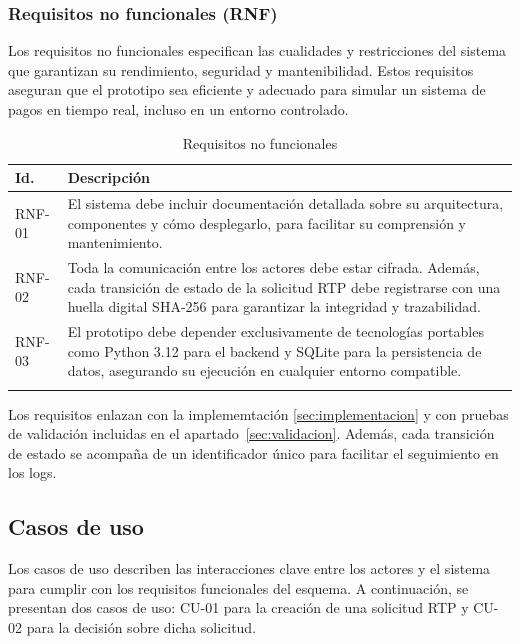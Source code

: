 \subsubsection{Requisitos no funcionales (RNF)}
Los requisitos no funcionales especifican las cualidades y restricciones del sistema que garantizan su rendimiento, seguridad y mantenibilidad. Estos requisitos aseguran que el prototipo sea eficiente y adecuado para simular un sistema de pagos en tiempo real, incluso en un entorno controlado.

\begin{longtable}{@{}>{\raggedright\arraybackslash}p{}p{}@{}}
\toprule
\textbf{Id.} & \textbf{Descripción} \\
\midrule\endhead
RNF-01 & El sistema debe incluir documentación detallada sobre su arquitectura, componentes y cómo desplegarlo, para facilitar su comprensión y mantenimiento. \\
RNF-02 & Toda la comunicación entre los actores debe estar cifrada. Además, cada transición de estado de la solicitud RTP debe registrarse con una huella digital SHA-256 para garantizar la integridad y trazabilidad. \\
RNF-03 & El prototipo debe depender exclusivamente de tecnologías portables como Python 3.12 para el backend y SQLite para la persistencia de datos, asegurando su ejecución en cualquier entorno compatible. \\
\bottomrule
\caption{Requisitos no funcionales}
\label{tab:RNF}
\end{longtable}

Los requisitos enlazan con la implememtación \ref{sec:implementacion} y con pruebas de validación incluidas en el apartado~\ref{sec:validacion}. Además, cada transición de estado se acompaña de un identificador único para facilitar el seguimiento en los logs.

\subsection{Casos de uso}
\label{subsec:diseno_casos_uso}

Los casos de uso describen las interacciones clave entre los actores y el sistema para cumplir con los requisitos funcionales del esquema. A continuación, se presentan dos casos de uso: CU-01 para la creación de una solicitud RTP y CU-02 para la decisión sobre dicha solicitud.

